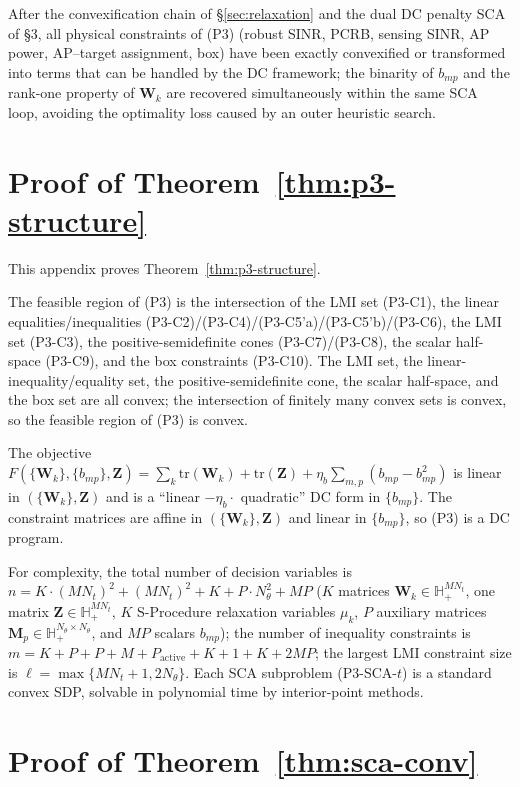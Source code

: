 \documentclass[12pt,a4paper]{article}
\newcommand{\mat}[1]{\mathbf{#1}}
\newcommand{\tr}{\text{tr}}
\begin{document}
After the convexification chain of \S\ref{sec:relaxation} and the dual DC penalty SCA of \S3, all physical constraints of (P3) (robust SINR, PCRB, sensing SINR, AP power, AP--target assignment, box) have been exactly convexified or transformed into terms that can be handled by the DC framework; the binarity of $b_{mp}$ and the rank-one property of $\mat{W}_k$ are recovered simultaneously within the same SCA loop, avoiding the optimality loss caused by an outer heuristic search.

\appendix
\section{Proof of Theorem~\ref{thm:p3-structure}}\label{app:proof-p3}

This appendix proves Theorem~\ref{thm:p3-structure}.

The feasible region of (P3) is the intersection of the LMI set (P3-C1), the linear equalities/inequalities (P3-C2)/(P3-C4)/(P3-C5'a)/(P3-C5'b)/(P3-C6), the LMI set (P3-C3), the positive-semidefinite cones (P3-C7)/(P3-C8), the scalar half-space (P3-C9), and the box constraints (P3-C10). The LMI set, the linear-inequality/equality set, the positive-semidefinite cone, the scalar half-space, and the box set are all convex; the intersection of finitely many convex sets is convex, so the feasible region of (P3) is convex.

The objective $F(\{\mat{W}_k\}, \{b_{mp}\}, \mat{Z}) = \sum_k \tr(\mat{W}_k) + \tr(\mat{Z}) + \eta_b \sum_{m,p} (b_{mp} - b_{mp}^2)$ is linear in $(\{\mat{W}_k\}, \mat{Z})$ and is a ``linear $- \eta_b \cdot$ quadratic'' DC form in $\{b_{mp}\}$. The constraint matrices are affine in $(\{\mat{W}_k\}, \mat{Z})$ and linear in $\{b_{mp}\}$, so (P3) is a DC program.

For complexity, the total number of decision variables is $n = K \cdot (MN_t)^2 + (MN_t)^2 + K + P \cdot N_\theta^2 + MP$ ($K$ matrices $\mat{W}_k \in \mathbb{H}_+^{MN_t}$, one matrix $\mat{Z} \in \mathbb{H}_+^{MN_t}$, $K$ S-Procedure relaxation variables $\mu_k$, $P$ auxiliary matrices $\mat{M}_p \in \mathbb{H}_+^{N_\theta \times N_\theta}$, and $MP$ scalars $b_{mp}$); the number of inequality constraints is $m = K + P + P + M + P_{\text{active}} + K + 1 + K + 2MP$; the largest LMI constraint size is $\ell = \max\{MN_t + 1, 2 N_\theta\}$. Each SCA subproblem (P3-SCA-$t$) is a standard convex SDP, solvable in polynomial time by interior-point methods.

\section{Proof of Theorem~\ref{thm:sca-conv}}\label{app:proof-sca-conv}
\end{document}
